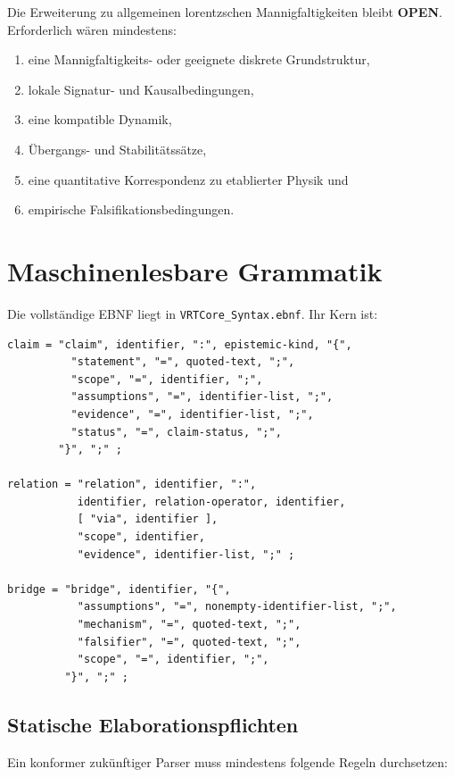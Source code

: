 \documentclass[11pt,a4paper]{article}
\newcommand{\code}[1]{\texttt{#1}}
\newcommand{\openstatus}{\textcolor{qikred}{\textbf{OPEN}}}
\begin{document}
Die Erweiterung zu allgemeinen lorentzschen Mannigfaltigkeiten bleibt
\openstatus. Erforderlich wären mindestens:

\begin{enumerate}
  \item eine Mannigfaltigkeits- oder geeignete diskrete Grundstruktur,
  \item lokale Signatur- und Kausalbedingungen,
  \item eine kompatible Dynamik,
  \item Übergangs- und Stabilitätssätze,
  \item eine quantitative Korrespondenz zu etablierter Physik und
  \item empirische Falsifikationsbedingungen.
\end{enumerate}

\section{Maschinenlesbare Grammatik}

Die vollständige EBNF liegt in \code{VRTCore\_Syntax.ebnf}. Ihr Kern ist:

\begin{lstlisting}[language={},caption={Auszug aus der VRTCore-Claimgrammatik}]
claim = "claim", identifier, ":", epistemic-kind, "{",
          "statement", "=", quoted-text, ";",
          "scope", "=", identifier, ";",
          "assumptions", "=", identifier-list, ";",
          "evidence", "=", identifier-list, ";",
          "status", "=", claim-status, ";",
        "}", ";" ;

relation = "relation", identifier, ":",
           identifier, relation-operator, identifier,
           [ "via", identifier ],
           "scope", identifier,
           "evidence", identifier-list, ";" ;

bridge = "bridge", identifier, "{",
           "assumptions", "=", nonempty-identifier-list, ";",
           "mechanism", "=", quoted-text, ";",
           "falsifier", "=", quoted-text, ";",
           "scope", "=", identifier, ";",
         "}", ";" ;
\end{lstlisting}

\subsection{Statische Elaborationspflichten}

Ein konformer zukünftiger Parser muss mindestens folgende Regeln durchsetzen:
\end{document}
